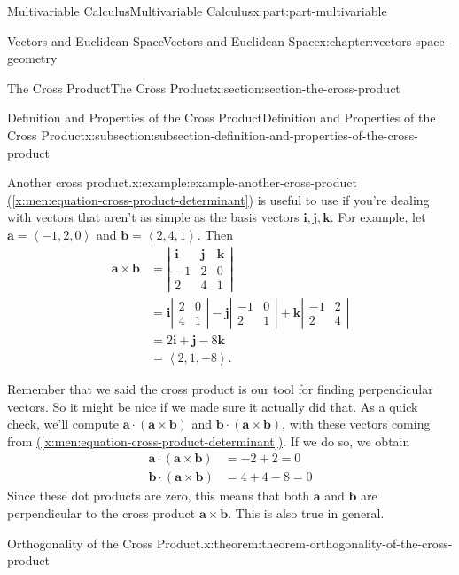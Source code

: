 \documentclass[twoside,10pt,]{tufte-book}
\newcommand{\xreffont}{\relax}
\numberwithin{equation}{part}
\newcommand{\dotprod}[1]{\left\langle #1 \right\rangle}
\begin{document}
\begin{partptx}{Multivariable Calculus}{}{Multivariable Calculus}{}{}{x:part:part-multivariable}
\begin{chapterptx}{Vectors and Euclidean Space}{}{Vectors and Euclidean Space}{}{}{x:chapter:vectors-space-geometry}
\begin{sectionptx}{The Cross Product}{}{The Cross Product}{}{}{x:section:section-the-cross-product}
\begin{subsectionptx}{Definition and Properties of the Cross Product}{}{Definition and Properties of the Cross Product}{}{}{x:subsection:subsection-definition-and-properties-of-the-cross-product}
\begin{example}{Another cross product.}{x:example:example-another-cross-product}
\hyperref[x:men:equation-cross-product-determinant]{({\xreffont\ref{x:men:equation-cross-product-determinant}})} is useful to use if you're dealing with vectors that aren't as simple as the basis vectors \(\mathbf{i},\mathbf{j},\mathbf{k}\). For example, let \(\mathbf{a} = \dotprod{-1,2,0}\) and \(\mathbf{b} = \dotprod{2,4,1}\). Then%
%
\begin{align*}
\mathbf{a}\times\mathbf{b} & = \left|\begin{array}{ccc}
\mathbf{i} & \mathbf{j} & \mathbf{k} \\
-1 & 2 & 0 \\
2 & 4 & 1 \end{array}\right| \\
& = \mathbf{i}\left|\begin{array}{cc} 2 & 0 \\ 4 & 1\end{array}\right| - \mathbf{j}\left|\begin{array}{cc} -1 & 0 \\ 2 & 1\end{array}\right| + \mathbf{k}\left|\begin{array}{cc} -1 & 2 \\ 2 & 4\end{array}\right|\\
& = 2\mathbf{i}+\mathbf{j}-8\mathbf{k}\\
& = \dotprod{2,1,-8}. 
\end{align*}
\end{example}
Remember that we said the cross product is our tool for finding perpendicular vectors. So it might be nice if we made sure it actually did that. As a quick check, we'll compute \(\mathbf{a}\cdot(\mathbf{a}\times\mathbf{b})\) and \(\mathbf{b}\cdot(\mathbf{a}\times\mathbf{b})\), with these vectors coming from \hyperref[x:men:equation-cross-product-determinant]{({\xreffont\ref{x:men:equation-cross-product-determinant}})}. If we do so, we obtain%
%
\begin{align*}
\mathbf{a}\cdot(\mathbf{a}\times\mathbf{b}) & = -2 + 2 = 0 \\
\mathbf{b}\cdot(\mathbf{a}\times\mathbf{b}) & = 4 + 4 - 8 = 0 
\end{align*}
Since these dot products are zero, this means that both \(\mathbf{a}\) and \(\mathbf{b}\) are perpendicular to the cross product \(\mathbf{a}\times\mathbf{b}\). This is also true in general.%
\begin{theorem}{Orthogonality of the Cross Product.}{}{x:theorem:theorem-orthogonality-of-the-cross-product}%

\end{theorem}
\end{subsectionptx}
\end{sectionptx}
\end{chapterptx}
\end{partptx}
\end{document}
